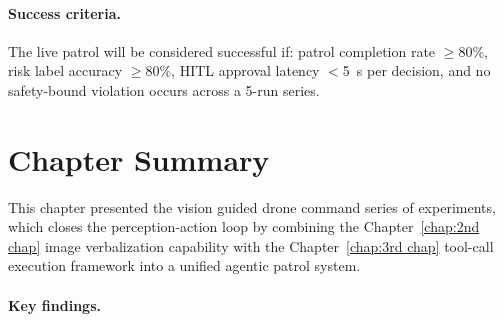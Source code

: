 \paragraph{Success criteria.}
The live patrol will be considered successful if: patrol completion rate $\geq$80\%,
risk label accuracy $\geq$80\%, HITL approval latency $<$5~s per decision, and no
safety-bound violation occurs across a 5-run series.

\section{Chapter Summary}
\label{sec:ch4_summary}

This chapter presented the vision guided drone command series of experiments, which closes the perception-action loop by combining the Chapter~\ref{chap:2nd chap} image verbalization capability with the Chapter~\ref{chap:3rd chap} tool-call execution framework into a unified agentic patrol system.

\paragraph{Key findings.}

